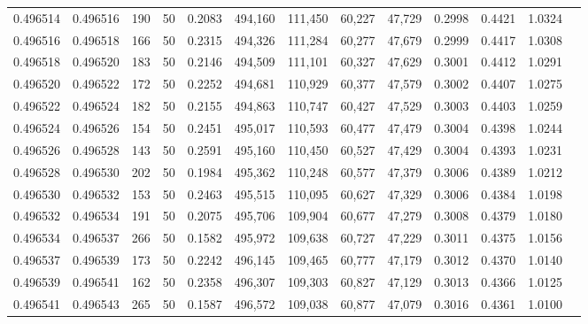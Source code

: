\begin{tabular}{rrrrrrrrrrrrr}
0.496514 & 0.496516 &   190 &  50 &                                     0.2083 & 494,160 & 111,450 &  60,227 &  47,729 & 0.2998 & 0.4421 & 1.0324 \\
0.496516 & 0.496518 &   166 &  50 &                                     0.2315 & 494,326 & 111,284 &  60,277 &  47,679 & 0.2999 & 0.4417 & 1.0308 \\
0.496518 & 0.496520 &   183 &  50 &                                     0.2146 & 494,509 & 111,101 &  60,327 &  47,629 & 0.3001 & 0.4412 & 1.0291 \\
0.496520 & 0.496522 &   172 &  50 &                                     0.2252 & 494,681 & 110,929 &  60,377 &  47,579 & 0.3002 & 0.4407 & 1.0275 \\
0.496522 & 0.496524 &   182 &  50 &                                     0.2155 & 494,863 & 110,747 &  60,427 &  47,529 & 0.3003 & 0.4403 & 1.0259 \\
0.496524 & 0.496526 &   154 &  50 &                                     0.2451 & 495,017 & 110,593 &  60,477 &  47,479 & 0.3004 & 0.4398 & 1.0244 \\
0.496526 & 0.496528 &   143 &  50 &                                     0.2591 & 495,160 & 110,450 &  60,527 &  47,429 & 0.3004 & 0.4393 & 1.0231 \\
0.496528 & 0.496530 &   202 &  50 &                                     0.1984 & 495,362 & 110,248 &  60,577 &  47,379 & 0.3006 & 0.4389 & 1.0212 \\
0.496530 & 0.496532 &   153 &  50 &                                     0.2463 & 495,515 & 110,095 &  60,627 &  47,329 & 0.3006 & 0.4384 & 1.0198 \\
0.496532 & 0.496534 &   191 &  50 &                                     0.2075 & 495,706 & 109,904 &  60,677 &  47,279 & 0.3008 & 0.4379 & 1.0180 \\
0.496534 & 0.496537 &   266 &  50 &                                     0.1582 & 495,972 & 109,638 &  60,727 &  47,229 & 0.3011 & 0.4375 & 1.0156 \\
0.496537 & 0.496539 &   173 &  50 &                                     0.2242 & 496,145 & 109,465 &  60,777 &  47,179 & 0.3012 & 0.4370 & 1.0140 \\
0.496539 & 0.496541 &   162 &  50 &                                     0.2358 & 496,307 & 109,303 &  60,827 &  47,129 & 0.3013 & 0.4366 & 1.0125 \\
0.496541 & 0.496543 &   265 &  50 &                                     0.1587 & 496,572 & 109,038 &  60,877 &  47,079 & 0.3016 & 0.4361 & 1.0100 \\

\end{tabular}
